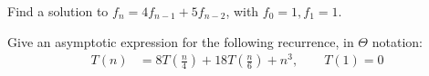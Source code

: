 \documentclass[12pt,twoside]{article}
\begin{document}
\newpage
\begin{problem}{10}
\bparts
{} Find a solution to $f_n = 4 f_{n-1} + 5 f_{n-2}$, with $f_0 =1 , f_1 = 1$.  

%
%
%
%

\newpage
{} Give an asymptotic expression for the following recurrence, in $\Theta$ notation:
\begin{equation*}
\begin{split}
T(n) &= 8T(\frac{n}{4}) + 18T(\frac{n}{6}) + n^3, \qquad T(1) = 0
\end{split}
\end{equation*}
\eparts
\end{problem}
\end{document}
